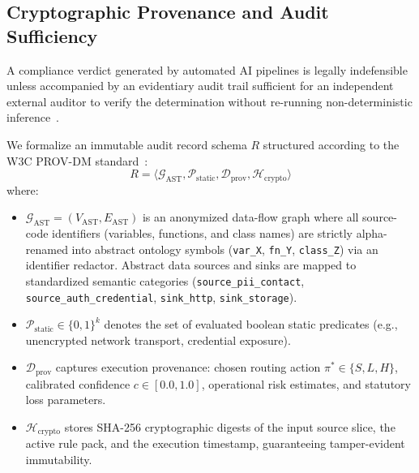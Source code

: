 \subsection{Cryptographic Provenance and Audit Sufficiency}
\label{sec:methodology:audit}

A compliance verdict generated by automated AI pipelines is legally indefensible unless accompanied by an evidentiary audit trail sufficient for an independent external auditor to verify the determination without re-running non-deterministic inference~\cite{paramasivan2025ai}.

We formalize an immutable audit record schema $R$ structured according to the W3C PROV-DM standard~\cite{moreau2013prov}:
\begin{equation}
R = \langle \mathcal{G}_{\text{AST}}, \mathcal{P}_{\text{static}}, \mathcal{D}_{\text{prov}}, \mathcal{H}_{\text{crypto}} \rangle
\end{equation}
where:
\begin{itemize}
    \item $\mathcal{G}_{\text{AST}} = (V_{\text{AST}}, E_{\text{AST}})$ is an anonymized data-flow graph where all source-code identifiers (variables, functions, and class names) are strictly alpha-renamed into abstract ontology symbols (\texttt{var\_X}, \texttt{fn\_Y}, \texttt{class\_Z}) via an identifier redactor. Abstract data sources and sinks are mapped to standardized semantic categories (\texttt{source\_pii\_contact}, \texttt{source\_auth\_credential}, \texttt{sink\_http}, \texttt{sink\_storage}).
    \item $\mathcal{P}_{\text{static}} \in \{0, 1\}^k$ denotes the set of evaluated boolean static predicates (e.g., unencrypted network transport, credential exposure).
    \item $\mathcal{D}_{\text{prov}}$ captures execution provenance: chosen routing action $\pi^* \in \{S, L, H\}$, calibrated confidence $c \in [0.0, 1.0]$, operational risk estimates, and statutory loss parameters.
    \item $\mathcal{H}_{\text{crypto}}$ stores SHA-256 cryptographic digests of the input source slice, the active rule pack, and the execution timestamp, guaranteeing tamper-evident immutability.
\end{itemize}

